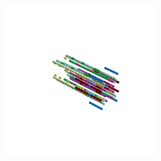 \begin{minipage}[b]{0.50\linewidth}
\begin{figure}[H]
        \vspace*{-8cm}
        \hspace*{2cm}
        \includegraphics[width=8cm]{src/symmetries/pattern3_4-45.png}
        \vspace*{-2.5cm}
  \caption*{}
  \end{figure}
\end{minipage}

